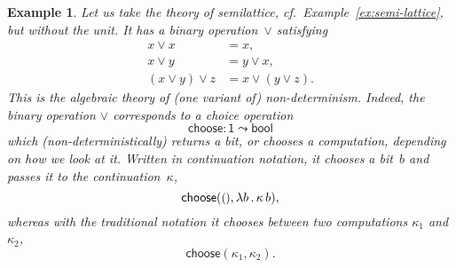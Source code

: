 \documentclass{amsart}
\newcommand{\lam}[1]{\lambda #1 \,.\,}
\newcommand{\opdecl}[3]{#1 : #2 \leadsto #3} %
\newcommand{\one}{\mathsf{1}} %
\newcommand{\unit}{{\text{\small$()$}}} %
\newcommand{\bool}{\mathsf{bool}} %
\newcommand{\kode}[1]{\mathsf{#1}}
\newcommand{\opcall}[3]{\kode{#1}(#2, #3)}
\newtheorem{example}{Example}[section]
\begin{document}
\begin{example}
  \label{ex:non-determinism}
  Let us take the theory of semilattice, cf.\ Example~\ref{ex:semi-lattice}, but without the
  unit. It has a binary operation~$\vee$ satisfying
  \begin{align*}
    x \vee x &= x, \\
    x \vee y &= y \vee x, \\
    (x \vee y) \vee z &= x \vee (y \vee z).
  \end{align*}
  This is the algebraic theory of (one variant of) \emph{non-determinism}.
  Indeed, the binary operation $\vee$ corresponds to a choice operation
  \begin{equation*}
    \opdecl{\kode{choose}}{\one}{\bool}
  \end{equation*}
  which (non-deterministically) returns a bit, or chooses a computation, depending
  on how we look at it. Written in continuation notation, it chooses a bit~$b$
  and passes it to the continuation~$\kappa$,
  \begin{equation*}
    \opcall{choose}{\unit}{\lam{b}{\kappa \, b}},
  \end{equation*}
  whereas with the traditional notation it chooses between two computations
  $\kappa_1$ and $\kappa_2$,
  \begin{equation*}
    \kode{choose}(\kappa_1, \kappa_2).
  \end{equation*}
\end{example}
\end{document}
